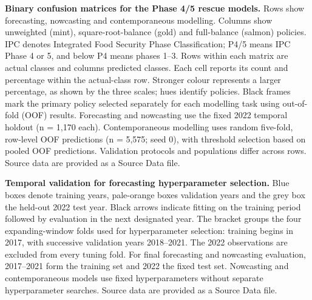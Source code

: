\caption{\textbf{Binary confusion matrices for the Phase 4/5 rescue models.} Rows show forecasting, nowcasting and contemporaneous modelling. Columns show unweighted (mint), square-root-balance (gold) and full-balance (salmon) policies. IPC denotes Integrated Food Security Phase Classification; P4/5 means IPC Phase 4 or 5, and below P4 means phases 1–3. Rows within each matrix are actual classes and columns predicted classes. Each cell reports its count and percentage within the actual-class row. Stronger colour represents a larger percentage, as shown by the three scales; hues identify policies. Black frames mark the primary policy selected separately for each modelling task using out-of-fold (OOF) results. Forecasting and nowcasting use the fixed 2022 temporal holdout (n = 1,170 each). Contemporaneous modelling uses random five-fold, row-level OOF predictions (n = 5,575; seed 0), with threshold selection based on pooled OOF predictions. Validation protocols and populations differ across rows. Source data are provided as a Source Data file.}

\caption{\textbf{Temporal validation for forecasting hyperparameter selection.} Blue boxes denote training years, pale-orange boxes validation years and the grey box the held-out 2022 test year. Black arrows indicate fitting on the training period followed by evaluation in the next designated year. The bracket groups the four expanding-window folds used for hyperparameter selection: training begins in 2017, with successive validation years 2018–2021. The 2022 observations are excluded from every tuning fold. For final forecasting and nowcasting evaluation, 2017–2021 form the training set and 2022 the fixed test set. Nowcasting and contemporaneous models use fixed hyperparameters without separate hyperparameter searches. Source data are provided as a Source Data file.}
